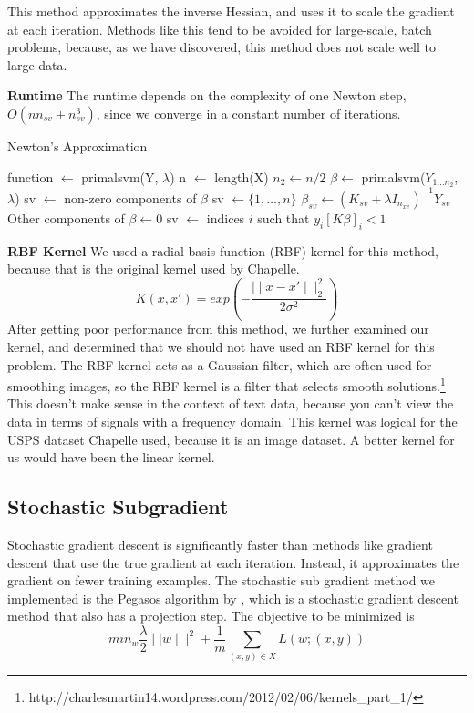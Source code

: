 \documentclass[letterpaper, 11pt]{article}
\begin{document}
This method approximates the inverse Hessian, and uses it to scale the gradient at each iteration.  Methods like this tend to be avoided for large-scale, batch problems, because, as we have discovered, this method does not scale well to large data.

\textbf{Runtime}  The runtime depends on the complexity of one Newton step, $O(nn_{sv} + n^3_{sv})$, since we converge in a constant number of iterations.  

\begin{algorithm}
\caption{Newton's Approximation}
\begin{algorithmic}
\STATE function $\leftarrow$ primalsvm(Y, $\lambda$)
\STATE n $\leftarrow$ length(X)
\STATE $n_2 \leftarrow n/2$
\STATE $\beta \leftarrow$ primalsvm($Y_{1\ldots n_2}$, $\lambda$)
\STATE sv $\leftarrow$ non-zero components of $\beta$
\ELSE
\STATE sv $\leftarrow \{ 1, \ldots, n \}$
\ENDIF
\REPEAT
\STATE $\beta_{sv} \leftarrow (K_{sv} + \lambda I_{n_{xv}})^{-1}Y_{sv}$
\STATE Other components of $\beta \leftarrow 0$
\STATE sv $\leftarrow$ indices $i$ such that $y_i[K\beta]_i < 1$
\end{algorithmic}
\end{algorithm}
\textbf{RBF Kernel}  We used a radial basis function (RBF) kernel for this method, because that is the original kernel used by Chapelle.  $$ K(x, x') = exp(-\frac{\mid \mid x-x' \mid \mid^2_2 }{2\sigma^2}) $$After getting poor performance from this method, we further examined our kernel, and determined that we should not have used an RBF kernel for this problem. The RBF kernel acts as a Gaussian filter, which are often used for smoothing images, so the RBF kernel is a filter that selects smooth solutions.\footnote{http://charlesmartin14.wordpress.com/2012/02/06/kernels\_part\_1/ }  This doesn't make sense in the context of text data, because you can't view the data in terms of signals with a frequency domain.  This kernel was logical for the USPS dataset Chapelle used, because it is an image dataset.  A better kernel for us would have been the linear kernel.

\subsection{Stochastic Subgradient}
Stochastic gradient descent is significantly faster than methods like gradient descent that use the true gradient at each iteration.  Instead, it approximates the gradient on fewer training examples.  The stochastic sub gradient method we implemented is the Pegasos algorithm by \citeauthor{pegasos}, which is a stochastic gradient descent method that also has a projection step.  The objective to be minimized is \begin{equation} min_w \frac{\lambda}{2} \mid \mid w \mid \mid ^2 +\frac{1}{m} \sum_{(x, y) \in X} L(w; (x,y)) \end{equation}
\end{document}
